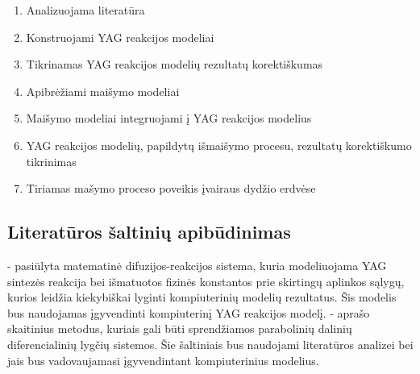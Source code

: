 \documentclass[]{VUMIFTemplateClass}
\begin{document}
\begin{enumerate}
    \item Analizuojama literatūra 
    \item Konstruojami YAG reakcijos modeliai
    \item Tikrinamas YAG reakcijos modelių rezultatų korektiškumas
    \item Apibrėžiami maišymo modeliai
    \item Maišymo modeliai integruojami į YAG reakcijos modelius
    \item YAG reakcijos modelių, papildytų išmaišymo procesu, rezultatų korektiškumo tikrinimas
    \item Tiriamas mašymo proceso poveikis įvairaus dydžio erdvėse
\end{enumerate}

\subsection{Literatūros šaltinių apibūdinimas}

\cite{ivanauskasComputationalModellingYAG2009,ivanauskasModellingSolidState2005,mackeviciusCloserLookComputer2012} - pasiūlyta matematinė difuzijos-reakcijos sistema, kuria modeliuojama YAG sintezės reakcija bei išmatuotos fizinės konstantos prie skirtingų aplinkos sąlygų, kurios leidžia kiekybiškai lyginti kompiuterinių modelių rezultatus. Šis modelis bus naudojamas įgyvendinti kompiuterinį YAG reakcijos modelį. \cite{pressNumericalRecipes3rd2007,levequeFiniteDifferenceMethods2007} - aprašo skaitinius metodus, kuriais gali būti sprendžiamos parabolinių dalinių diferencialinių lygčių sistemos. Šie šaltiniais bus naudojami literatūros analizei bei jais bus vadovaujamasi įgyvendintant kompiuterinius modelius.

\printbibliography[title = {Literatūra ir šaltiniai}]
\end{document}
